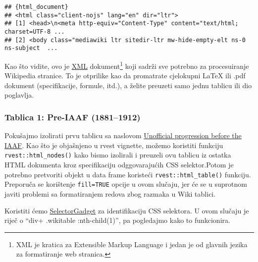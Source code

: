 \documentclass[
]{article}
\newenvironment{Shaded}{\begin{snugshade}}{\end{snugshade}}
\newcommand{\DataTypeTok}[1]{\textcolor[rgb]{0.13,0.29,0.53}{#1}}
\newcommand{\KeywordTok}[1]{\textcolor[rgb]{0.13,0.29,0.53}{\textbf{#1}}}
\newcommand{\NormalTok}[1]{#1}
\newcommand{\OperatorTok}[1]{\textcolor[rgb]{0.81,0.36,0.00}{\textbf{#1}}}
\newcommand{\OtherTok}[1]{\textcolor[rgb]{0.56,0.35,0.01}{#1}}
\newcommand{\StringTok}[1]{\textcolor[rgb]{0.31,0.60,0.02}{#1}}
\begin{document}
\begin{verbatim}
## {html_document}
## <html class="client-nojs" lang="en" dir="ltr">
## [1] <head>\n<meta http-equiv="Content-Type" content="text/html; charset=UTF-8 ...
## [2] <body class="mediawiki ltr sitedir-ltr mw-hide-empty-elt ns-0 ns-subject  ...
\end{verbatim}

Kao što vidite, ovo je \href{https://en.wikipedia.org/wiki/XML}{XML}
dokument\footnote{XML je kratica za Extensible Markup Language i jedan
  je od glavnih jezika za formatiranje web stranica.} koji sadrži sve
potrebno za procesuiranje Wikipedia stranice. To je otprilike kao da
promatrate cjelokupni LaTeX ili .pdf dokument (specifikacije, formule,
itd.), a želite preuzeti samo jednu tablicu ili dio poglavlja.

\hypertarget{tablica-1-pre-iaaf-18811912}{%
\subsubsection{Tablica 1: Pre-IAAF
(1881--1912)}\label{tablica-1-pre-iaaf-18811912}}

Pokušajmo izolirati prvu tablicu sa naslovom
\href{https://en.wikipedia.org/wiki/Men\%27s_100_metres_world_record_progression\#Unofficial_progression_before_the_IAAF}{Unofficial
progression before the IAAF}. Kao što je objašnjeno u rvest vignette,
možemo koristiti funkciju \texttt{rvest::html\_nodes()} kako bismo
izolirali i preuzeli ovu tablicu iz ostatka HTML dokumenta kroz
specifikaciju odggovarajućih CSS selektor.Potom je potrebno pretvoriti
objekt u data frame koristeći \texttt{rvest::html\_table()} funkciju.
Preporuča se korištenje \texttt{fill=TRUE} opcije u ovom slučaju, jer će
se u suprotnom javiti problemi sa formatiranjem redova zbog razmaka u
Wiki tablici.

Koristiti ćemo \href{http://selectorgadget.com/}{SelectorGadget} za
identifikaciju CSS selektora. U ovom slučaju je riječ o ``div+
.wikitable :nth-child(1)'', pa pogledajmo kako to funkcionira.

\begin{Shaded}
\end{Shaded}
\end{document}

